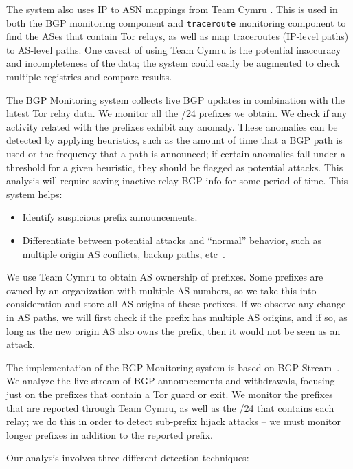 The system also uses IP to ASN mappings from Team Cymru \cite{teamcymru}.  This is used in both the BGP monitoring component and {\tt traceroute} monitoring component to find the ASes that contain Tor relays, as well as map traceroutes (IP-level paths) to AS-level paths.  One caveat of using Team Cymru is the potential inaccuracy and incompleteness of the data; the system could easily be augmented to check multiple registries and compare results.

The BGP Monitoring system collects live BGP updates in combination with the latest Tor relay data. We monitor all the /24 prefixes we obtain. We check if any activity related with the prefixes exhibit any anomaly. These anomalies can be detected by applying heuristics, such as the amount of time that a BGP path is used or the frequency that a path is announced; if certain anomalies fall under a threshold for a given heuristic, they should be flagged as potential attacks. This analysis will require saving inactive relay BGP info for some period of time.  This system helps:

\begin{itemize}
\item Identify suspicious prefix announcements.
\item Differentiate between potential attacks and ``normal'' behavior, such as multiple origin AS conflicts, backup paths, etc~\cite{zhao2001analysis}.
\end{itemize}

We use Team Cymru \cite{teamcymru} to obtain AS ownership of prefixes. Some prefixes are owned by an organization with multiple AS numbers, so we take this into consideration and store all AS origins of these prefixes. If we observe any change in AS paths, we will first check if the prefix has multiple AS origins, and if so, as long as the new origin AS also owns the prefix, then it would not be seen as an attack. 

The implementation of the BGP Monitoring system is based on BGP Stream~\cite{bgpstream}.  We analyze the live stream of BGP announcements and withdrawals, focusing just on the prefixes that contain a Tor guard or exit.  We monitor the prefixes that are reported through Team Cymru, as well as the /24 that contains each relay; we do this in order to detect sub-prefix hijack attacks -- we must monitor longer prefixes in addition to the reported prefix.  

Our analysis involves three different detection techniques:


